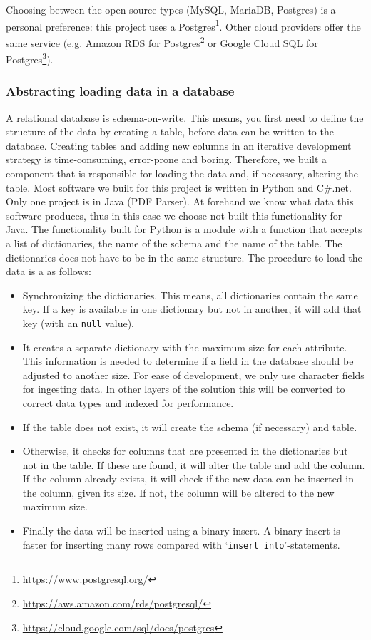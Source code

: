 \documentclass{ou-report}
\begin{document}
Choosing between the open-source types (MySQL, MariaDB, Postgres) is a personal 
preference: this project uses a
Postgres\footnote{\url{https://www.postgresql.org/}}. Other cloud providers
offer the same service (e.g. Amazon RDS for
Postgres\footnote{\url{https://aws.amazon.com/rds/postgresql/}} or Google Cloud
SQL for Postgres\footnote{\url{https://cloud.google.com/sql/docs/postgres}}).
\subsubsection{Abstracting loading data in a database}
\label{gen_impl:abstract_database}
A relational database is schema-on-write. This means, you first need to define 
the structure of the data by creating a table, before data can be written to the
database.
Creating tables and adding new columns in an iterative development strategy is
time-consuming, error-prone and boring. Therefore, we built a component that is 
responsible for loading the data and, if necessary, altering the table.
Most software we built for this project is written in Python and C\#.net. Only
one project is in Java (PDF Parser). At forehand we know what data this software
produces, thus in this case we choose not built this functionality for Java.
The functionality built for Python is a module with a function that accepts a 
list of dictionaries, the name of the schema and the name of the table. The 
dictionaries does not have to be in the same 
structure. The procedure to load the data is a as follows:
\begin{itemize}
    \item Synchronizing the dictionaries. This means, all dictionaries contain
    the same key. If a key is available in one dictionary but not in another, it
    will add that key (with an \verb|null| value).
    \item It creates a separate dictionary with the maximum size for each 
    attribute. This
    information is needed to determine if a field in the database should be 
    adjusted to another size. For ease of development, we only use character 
    fields for ingesting data. In other layers of the solution this will be 
    converted to correct data types and indexed for performance.
    \item If the table does not exist, it will create the schema (if necessary) 
    and table.
    \item Otherwise, it checks for columns that are presented in the 
    dictionaries but not in the table. If these are found, it will alter the 
    table and add the column. If the column already exists, it will check if the
    new data can be inserted in the column, given its size. If not, the column
    will be altered to the new maximum size.
    \item Finally the data will be inserted using a binary insert. A binary 
    insert is faster for inserting many rows compared with 
    `\verb|insert into|'-statements.
\end{itemize}
\end{document}
